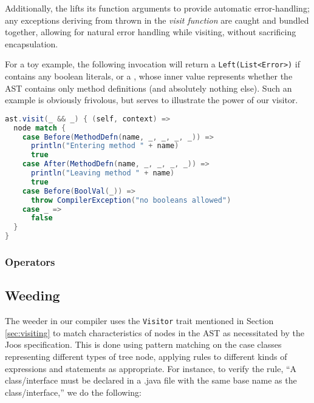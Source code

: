 \documentclass{article}
\begin{document}
Additionally, the \value{Visitor} lifts its function arguments to provide automatic error-handling; any exceptions
deriving from  thrown in the \textit{visit function} are caught and bundled together, allowing for
natural error handling while visiting, without sacrificing encapsulation.

For a toy example, the following invocation will return a \texttt{Left(List<Error>)} if \value{ast} contains any boolean
literals, or a \value{Right(Boolean)}, whose inner value represents whether the AST contains only method definitions
(and absolutely nothing else). Such an example is obviously frivolous, but serves to illustrate the power of our
visitor.

\begin{lstlisting}[language=Scala]
ast.visit(_ && _) { (self, context) =>
  node match {
    case Before(MethodDefn(name, _, _, _, _)) =>
      println("Entering method " + name)
      true
    case After(MethodDefn(name, _, _, _, _)) =>
      println("Leaving method " + name)
      true
    case Before(BoolVal(_)) =>
      throw CompilerException("no booleans allowed")
    case _ =>
      false
  }
}
\end{lstlisting}




\subsubsection{Operators}







\subsection{Weeding}
The weeder in our compiler uses the {\tt Visitor} trait mentioned in Section \ref{sec:visiting} to match
characteristics of nodes in the AST as necessitated by the Joos specification. This is done using pattern matching
on the case classes representing different types of tree node, applying rules to different kinds of expressions and
statements as appropriate. For instance, to verify the rule, ``A class/interface must be declared in a
.java file with the same base name as the class/interface,'' we do the following:
\end{document}
